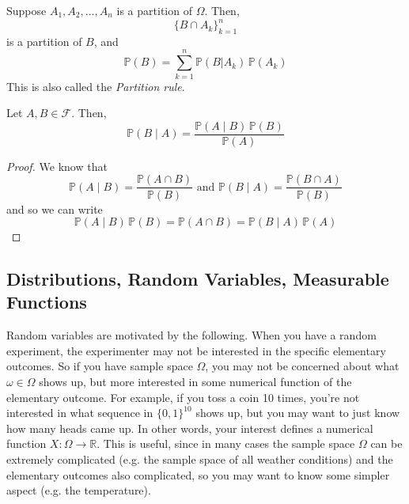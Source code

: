     \begin{lemma}
      Suppose $A_1, A_2, ..., A_n$ is a partition of $\Omega$. Then, 
      \begin{equation}
        \{B \cap A_k\}_{k=1}^n
      \end{equation}
      is a partition of $B$, and 
      \begin{equation}
        \mathbb{P}(B) = \sum_{k=1}^n \mathbb{P} (B|A_k)\, \mathbb{P}(A_k)
      \end{equation}
      This is also called the \textit{Partition rule}. 
    \end{lemma}

    \begin{theorem}
      Let $A, B \in \mathcal{F}$. Then, 
      \begin{equation}
        \mathbb{P}(B \mid A) = \frac{\mathbb{P}(A \mid B) \, \mathbb{P}(B)}{\mathbb{P}(A)}
      \end{equation}
    \end{theorem}
    \begin{proof}
      We know that 
      \begin{equation}
        \mathbb{P}(A \mid B) = \frac{\mathbb{P} (A \cap B)}{\mathbb{P}(B)} \text{ and } \mathbb{P}(B \mid A) = \frac{\mathbb{P}(B \cap A)}{\mathbb{P}(B)}
      \end{equation}
      and so we can write 
      \begin{equation}
        \mathbb{P} (A \mid B) \, \mathbb{P}(B) = \mathbb{P}(A \cap B) = \mathbb{P}(B \mid A) \, \mathbb{P}(A)
      \end{equation}
    \end{proof}

\subsection{Distributions, Random Variables, Measurable Functions}

  Random variables are motivated by the following. When you have a random experiment, the experimenter may not be interested in the specific elementary outcomes. So if you have sample space $\Omega$, you may not be concerned about what $\omega \in \Omega$ shows up, but more interested in some numerical function of the elementary outcome. For example, if you toss a coin 10 times, you're not interested in what sequence in $\{0, 1\}^{10}$ shows up, but you may want to just know how many heads came up. In other words, your interest defines a numerical function $X: \Omega \rightarrow \mathbb{R}$. This is useful, since in many cases the sample space $\Omega$ can be extremely complicated (e.g. the sample space of all weather conditions) and the elementary outcomes also complicated, so you may want to know some simpler aspect (e.g. the temperature). 

